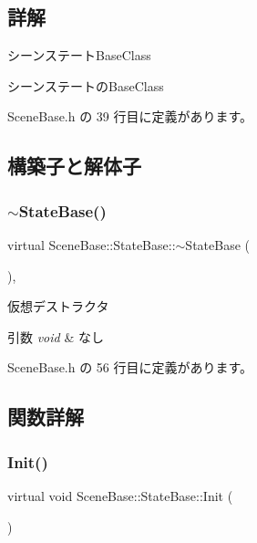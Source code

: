\subsection{詳解}
シーンステート\+Base\+Class 

シーンステートの\+Base\+Class 

 Scene\+Base.\+h の 39 行目に定義があります。



\subsection{構築子と解体子}
\mbox{\label{class_scene_base_1_1_state_base_afc993757f908babc872063e1e2465e3e}} 
\subsubsection{\texorpdfstring{$\sim$\+State\+Base()}{~StateBase()}}
{\footnotesize\ttfamily virtual Scene\+Base\+::\+State\+Base\+::$\sim$\+State\+Base (\begin{DoxyParamCaption}{ }\end{DoxyParamCaption})\hspace{0.3cm}{\ttfamily [inline]}, {\ttfamily [virtual]}}



仮想デストラクタ 


\begin{DoxyParams}{引数}
{\em void} & なし \\
\hline
\end{DoxyParams}


 Scene\+Base.\+h の 56 行目に定義があります。



\subsection{関数詳解}
\mbox{\label{class_scene_base_1_1_state_base_a33350231b039a2178c19beac0211c5b8}} 
\subsubsection{\texorpdfstring{Init()}{Init()}}
{\footnotesize\ttfamily virtual void Scene\+Base\+::\+State\+Base\+::\+Init (\begin{DoxyParamCaption}{ }\end{DoxyParamCaption})\hspace{0.3cm}{\ttfamily [pure virtual]}}



